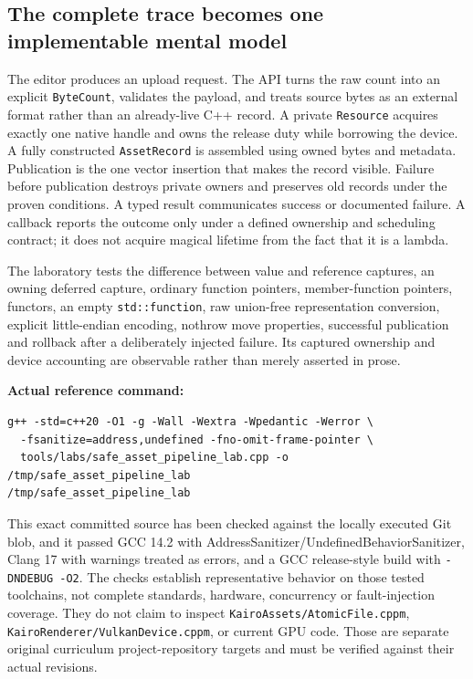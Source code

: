 \subsection{The complete trace becomes one implementable mental model}\label{01-foundations-i-ch004-the-complete-trace-becomes-one-implementable-mental-model}

The editor produces an upload request. The API turns the raw count into an explicit \texttt{ByteCount}, validates the payload, and treats source bytes as an external format rather than an already-live C++ record. A private \texttt{Resource} acquires exactly one native handle and owns the release duty while borrowing the device. A fully constructed \texttt{AssetRecord} is assembled using owned bytes and metadata. Publication is the one vector insertion that makes the record visible. Failure before publication destroys private owners and preserves old records under the proven conditions. A typed result communicates success or documented failure. A callback reports the outcome only under a defined ownership and scheduling contract; it does not acquire magical lifetime from the fact that it is a lambda.

The laboratory tests the difference between value and reference captures, an owning deferred capture, ordinary function pointers, member-function pointers, functors, an empty \texttt{std::function}, raw union-free representation conversion, explicit little-endian encoding, nothrow move properties, successful publication and rollback after a deliberately injected failure. Its captured ownership and device accounting are observable rather than merely asserted in prose.

\textbf{Actual reference command:}

\begin{verbatim}
g++ -std=c++20 -O1 -g -Wall -Wextra -Wpedantic -Werror \
  -fsanitize=address,undefined -fno-omit-frame-pointer \
  tools/labs/safe_asset_pipeline_lab.cpp -o /tmp/safe_asset_pipeline_lab
/tmp/safe_asset_pipeline_lab
\end{verbatim}

This exact committed source has been checked against the locally executed Git blob, and it passed GCC 14.2 with AddressSanitizer/UndefinedBehaviorSanitizer, Clang 17 with warnings treated as errors, and a GCC release-style build with \texttt{-DNDEBUG\ -O2}. The checks establish representative behavior on those tested toolchains, not complete standards, hardware, concurrency or fault-injection coverage. They do not claim to inspect \texttt{KairoAssets/AtomicFile.cppm}, \texttt{KairoRenderer/VulkanDevice.cppm}, or current GPU code. Those are separate original curriculum project-repository targets and must be verified against their actual revisions.


